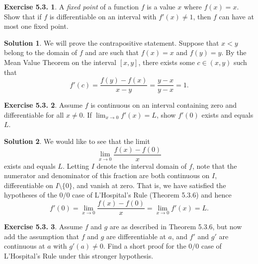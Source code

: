 \documentclass[12pt]{article}
\theoremstyle{definition}
\theoremstyle{exercise}
\newtheorem{exercise}{Exercise 5.3.}
\theoremstyle{solution}
\newtheorem*{solution}{Solution}
\begin{document}
\begin{exercise}
\label{ex:7}
    A \textit{fixed point} of a function \( f \) is a value \( x \) where \( f(x) = x \). Show that if \( f \) is differentiable on an interval with \( f'(x) \neq 1 \), then \( f \) can have at most one fixed point.
\end{exercise}

\begin{solution}
    We will prove the contrapositive statement. Suppose that \( x < y \) belong to the domain of \( f \) and are such that \( f(x) = x \) and \( f(y) = y \). By the Mean Value Theorem on the interval \( [x, y] \), there exists some \( c \in (x, y) \) such that
    \[
        f'(c) = \frac{f(y) - f(x)}{x - y} = \frac{y - x}{y - x} = 1.
    \]
\end{solution}

\begin{exercise}
\label{ex:8}
    Assume \( f \) is continuous on an interval containing zero and differentiable for all \( x \neq 0 \). If \( \lim_{x \to 0} f'(x) = L \), show \( f'(0) \) exists and equals \( L \).
\end{exercise}

\begin{solution}
    We would like to see that the limit
    \[
        \lim_{x \to 0} \frac{f(x) - f(0)}{x}
    \]
    exists and equals \( L \). Letting \( I \) denote the interval domain of \( f \), note that the numerator and denominator of this fraction are both continuous on \( I \), differentiable on \( I \setminus \{ 0 \} \), and vanish at zero. That is, we have satisfied the hypotheses of the \( 0 / 0 \) case of L'Hospital's Rule (Theorem 5.3.6) and hence
    \[
        f'(0) = \lim_{x \to 0} \frac{f(x) - f(0)}{x} = \lim_{x \to 0} f'(x) = L.
    \]
\end{solution}

\begin{exercise}
\label{ex:9}
    Assume \( f \) and \( g \) are as described in Theorem 5.3.6, but now add the assumption that \( f \) and \( g \) are differentiable at \( a \), and \( f' \) and \( g' \) are continuous at \( a \) with \( g'(a) \neq 0 \). Find a short proof for the \( 0 / 0 \) case of L'Hospital's Rule under this stronger hypothesis.
\end{exercise}
\end{document}
